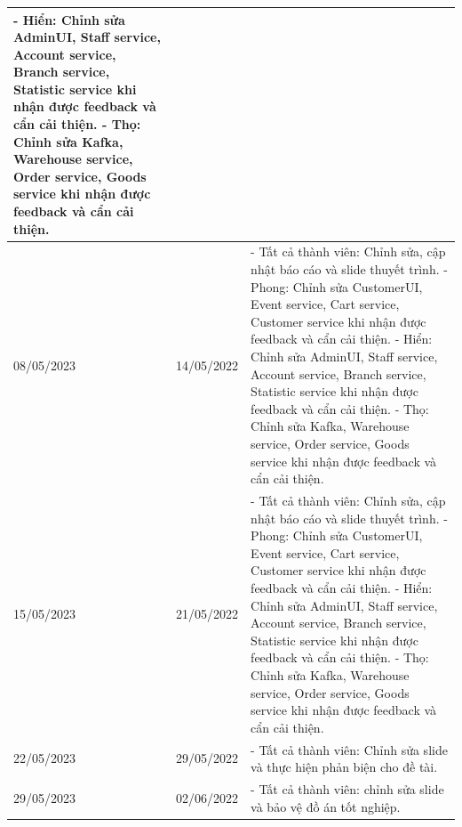 {\begin{longtable}{| p{2cm} | p{2cm} | p{10cm} |}
    - Hiển: Chỉnh sửa AdminUI, Staff service, Account service, Branch service, Statistic service khi nhận được feedback và cẩn cải thiện. 
    \newline
    - Thọ: Chỉnh sửa Kafka, Warehouse service, Order service, Goods service khi nhận được feedback và cẩn cải thiện. \\
	\hline
	08/05/2023 & 14/05/2022 & 
    - Tất cả thành viên: Chỉnh sửa, cập nhật báo cáo và slide thuyết trình.
    \newline
    - Phong: Chỉnh sửa CustomerUI, Event service, Cart service, Customer service khi nhận được feedback và cẩn cải thiện. 
    \newline
    - Hiển: Chỉnh sửa AdminUI, Staff service, Account service, Branch service, Statistic service khi nhận được feedback và cẩn cải thiện. 
    \newline
    - Thọ: Chỉnh sửa Kafka, Warehouse service, Order service, Goods service khi nhận được feedback và cẩn cải thiện. \\
	\hline
	15/05/2023 & 21/05/2022 & 
    - Tất cả thành viên: Chỉnh sửa, cập nhật báo cáo và slide thuyết trình.
    \newline
    - Phong: Chỉnh sửa CustomerUI, Event service, Cart service, Customer service khi nhận được feedback và cẩn cải thiện. 
    \newline
    - Hiển: Chỉnh sửa AdminUI, Staff service, Account service, Branch service, Statistic service khi nhận được feedback và cẩn cải thiện. 
    \newline
    - Thọ: Chỉnh sửa Kafka, Warehouse service, Order service, Goods service khi nhận được feedback và cẩn cải thiện. \\
	\hline
	22/05/2023 & 29/05/2022 & 
    - Tất cả thành viên: Chỉnh sửa slide và thực hiện phản biện cho đề tài. \\
	\hline
	29/05/2023 & 02/06/2022 & 
    - Tất cả thành viên: chỉnh sửa slide và bảo vệ đồ án tốt nghiệp. \\
	\hline

\end{longtable}
}

